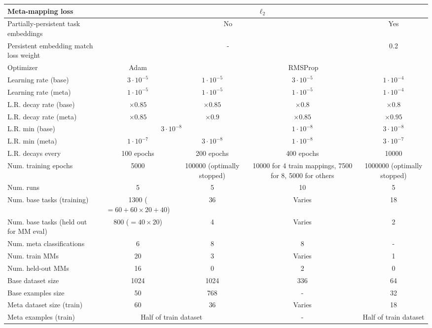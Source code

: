 \begin{table}
\begin{tabular}{|p{3cm}||c|c|c|c|}
Meta-mapping loss & \multicolumn{4}{c|}{$\ell_2$}\\\hline
Partially-persistent task embeddings & \multicolumn{3}{c|}{No} & Yes \\\hline
Persistent embedding match loss weight & \multicolumn{3}{c|}{-} & 0.2 \\\hline
\hline
Optimizer & Adam & \multicolumn{3}{c|}{RMSProp} \\\hline
Learning rate (base) & $3\cdot 10^{-5}$ & $1\cdot 10^{-5}$ & $3\cdot 10^{-5}$ & $1\cdot 10^{-4}$\\\hline
Learning rate (meta) & $1\cdot 10^{-5}$ & $1\cdot 10^{-5}$ & $1\cdot 10^{-5}$ & $1\cdot 10^{-4}$\\\hline
L.R. decay rate (base) & $\times0.85$ & $\times0.85$ & $\times0.8$ & $\times0.8$\\\hline
L.R. decay rate (meta) & $\times0.85$ & $\times0.9$ & $\times0.85$ & $\times0.95$ \\\hline
L.R. min (base) & \multicolumn{2}{c|}{$3 \cdot 10^{-8}$}  & $1 \cdot 10^{-8}$ & $3 \cdot 10^{-8}$\\\hline
L.R. min (meta) & $1 \cdot 10^{-7}$& $3 \cdot 10^{-8}$ &  $1 \cdot 10^{-8}$ & $3 \cdot 10^{-7}$\\\hline
L.R. decays every & 100 epochs & 200 epochs & 400 epochs & 10000 \\\hline
Num. training epochs & 5000 & \multicolumn{1}{p{2.3cm}|}{100000 (optimally stopped)} & \multicolumn{1}{p{2.3cm}|}{10000 for 4 train mappings, 7500 for 8, 5000 for others} & \multicolumn{1}{p{2.3cm}|}{1000000 (optimally stopped)} \\\hline
Num. runs & 5 & 5 & 10 & 5 \\ \hline
\hline
Num. base tasks (training) & \multicolumn{1}{p{2.3cm}|}{1300 ( $= 60 + 60 \times  20 + 40$)} & 36 & Varies & 18 \\\hline
Num. base tasks (held out for MM eval) & 800 ($= 40 \times 20$)  & 4 & Varies & 2 \\\hline
Num. meta classifications & 6 & 8 & 8 & - \\\hline
Num. train MMs & 20 & 3 & Varies & 1 \\\hline
Num. held-out MMs & 16 & 0 & 2 & 0  \\\hline
Base dataset size & 1024 & 1024 & 336 & 64 \\\hline
Base examples size & 50 & 768 & - & 32 \\\hline
Meta dataset size (train) & 60 & 36 & Varies & 18 \\\hline
Meta examples (train) & \multicolumn{2}{c|}{Half of train dataset} & - & Half of train dataset \\\hline

\end{tabular}
\end{table}
